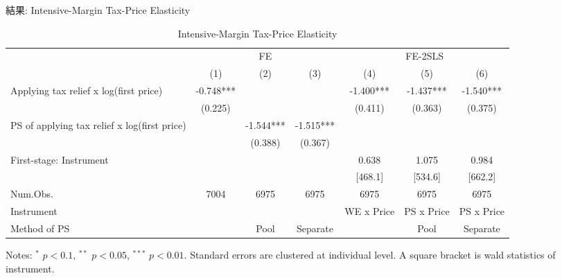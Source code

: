 \documentclass[
  ignorenonframetext,
  aspectratio=169,
]{beamer}
\begin{document}
\begin{frame}{結果: Intensive-Margin Tax-Price Elasticity}
\protect\hypertarget{ux7d50ux679c-intensive-margin-tax-price-elasticity}{}
\begin{table}

\caption{\label{tab:MainIntensive}Intensive-Margin Tax-Price Elasticity}
\centering
\fontsize{7}{9}\selectfont
\begin{threeparttable}
\begin{tabular}[t]{lcccccc}
\toprule
\multicolumn{1}{c}{ } & \multicolumn{3}{c}{FE} & \multicolumn{3}{c}{FE-2SLS} \\
\cmidrule(l{3pt}r{3pt}){2-4} \cmidrule(l{3pt}r{3pt}){5-7}
  & (1) & (2) & (3) & (4) & (5) & (6)\\
\midrule
Applying tax relief x log(first price) & -0.748*** &  &  & -1.400*** & -1.437*** & -1.540***\\
 & (0.225) &  &  & (0.411) & (0.363) & (0.375)\\
PS of applying tax relief x log(first price) &  & -1.544*** & -1.515*** &  &  & \\
 &  & (0.388) & (0.367) &  &  & \\
\midrule
First-stage: Instrument &  &  &  & 0.638 & 1.075 & 0.984\\
 &  &  &  & [468.1] & [534.6] & [662.2]\\
Num.Obs. & 7004 & 6975 & 6975 & 6975 & 6975 & 6975\\
Instrument &  &  &  & WE x Price & PS x Price & PS x Price\\
Method of PS &  & Pool & Separate &  & Pool & Separate\\
\bottomrule
\end{tabular}
\begin{tablenotes}
\item Notes: $^{*}$ $p < 0.1$, $^{**}$ $p < 0.05$, $^{***}$ $p < 0.01$. Standard errors are clustered at individual level. A square bracket is wald statistics of instrument.
\end{tablenotes}
\end{threeparttable}
\end{table}
\end{frame}
\end{document}
